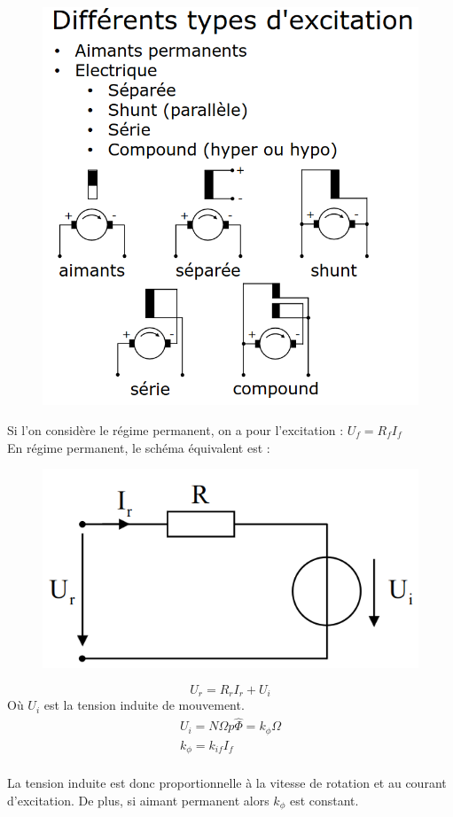 \documentclass[../main.tex]{subfiles}
\begin{document}
\begin{figure}[hbt!]
    \centering
    \includegraphics[width=.5\textwidth]{IMAGES/elec/mcc.png}
\end{figure}

Si l'on considère le régime permanent, on a pour l'excitation : $U_f = R_f I_f$\\

En régime permanent, le schéma équivalent est : \begin{figure}[hbt!]
    \centering
    \includegraphics[width=.5\textwidth]{IMAGES/elec/mccschema.png}
\end{figure}

\begin{equation}
    U_r = R_r I_r + U_i
\end{equation}
Où $U_i$ est la tension induite de mouvement.\\

\begin{equation}
\begin{gathered}
    U_i = N \Omega p \hat{\Phi} = k_\phi \Omega\\
    k_\phi = k_{if} I_f\\
\end{gathered}
\end{equation}

La tension induite est donc proportionnelle à la vitesse de rotation et au courant d'excitation. De plus, si aimant permanent alors $k_\phi$ est constant.\\
\end{document}
